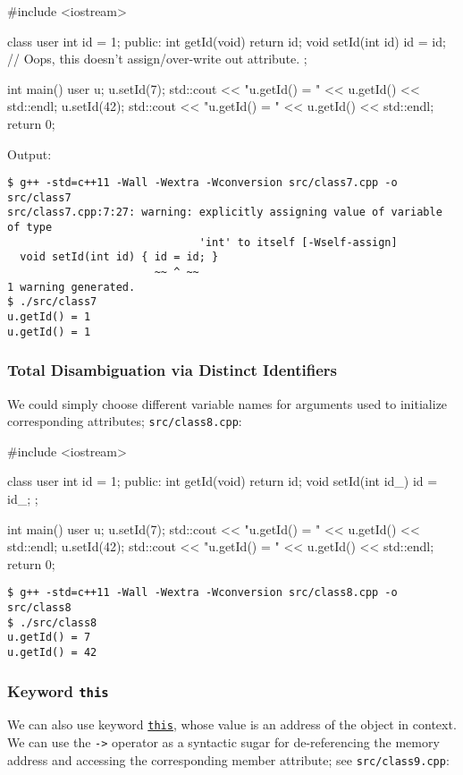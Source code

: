 \documentclass[12pt,letterpaper,twoside]{article}
\begin{document}
\begin{cpp}
#include <iostream>

class user {
  int id = 1;
 public:
  int getId(void) { return id; }
  void setId(int id) { id = id; }   // Oops, this doesn't assign/over-write out attribute.
};

int main() {
  user u;
  u.setId(7);
  std::cout << "u.getId() = " << u.getId() << std::endl;
  u.setId(42);
  std::cout << "u.getId() = " << u.getId() << std::endl;
  return 0;
}
\end{cpp}

Output:

\begin{verbatim}
$ g++ -std=c++11 -Wall -Wextra -Wconversion src/class7.cpp -o src/class7
src/class7.cpp:7:27: warning: explicitly assigning value of variable of type 
                              'int' to itself [-Wself-assign]
  void setId(int id) { id = id; }
                       ~~ ^ ~~
1 warning generated.
$ ./src/class7
u.getId() = 1
u.getId() = 1
\end{verbatim}

\subsubsection{Total Disambiguation via Distinct Identifiers}
We could simply choose different 
variable names for arguments used to initialize corresponding attributes;
\texttt{src/class8.cpp}:

\begin{cpp}
#include <iostream>

class user {
  int id = 1;
 public:
  int getId(void) { return id; }
  void setId(int id_) { id = id_; }
};

int main() {
  user u;
  u.setId(7);
  std::cout << "u.getId() = " << u.getId() << std::endl;
  u.setId(42);
  std::cout << "u.getId() = " << u.getId() << std::endl;
  return 0;
}
\end{cpp}

\begin{verbatim}
$ g++ -std=c++11 -Wall -Wextra -Wconversion src/class8.cpp -o src/class8
$ ./src/class8
u.getId() = 7
u.getId() = 42
\end{verbatim}

\subsubsection{Keyword \texttt{this}} We can also use keyword 
\href{https://en.cppreference.com/w/cpp/language/this}{\texttt{this}}, whose
value is an address of the object in context. We can use the \texttt{->} 
operator as a syntactic sugar for de-referencing the memory address and 
accessing the corresponding member attribute; see
\texttt{src/class9.cpp}:
\end{document}
